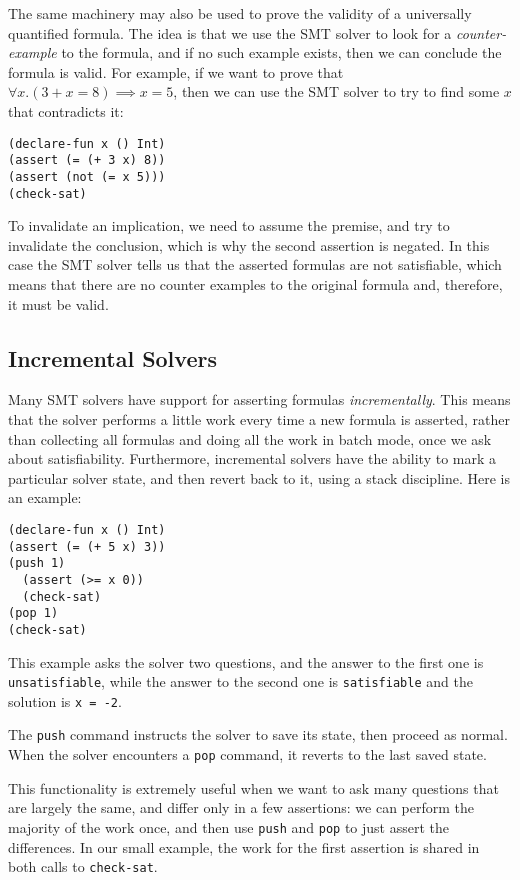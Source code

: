 \documentclass{sigplanconf}
\begin{document}
The same machinery may also be used to prove the validity of
a universally quantified formula. The idea is that we use the SMT solver
to look for a {\em counter-example} to the formula, and if no such
example exists, then we can conclude the formula is valid.
For example, if we want to prove that $\forall x. (3 + x = 8) \implies x = 5$,
then we can use the SMT solver to try to find some $x$ that contradicts it:

\break

\begin{Verbatim}
(declare-fun x () Int)
(assert (= (+ 3 x) 8))
(assert (not (= x 5)))
(check-sat)
\end{Verbatim}

To invalidate an implication, we need to assume the premise, and try to
invalidate the conclusion, which is why the second assertion is negated.
In this case the SMT solver tells us that the asserted formulas are not
satisfiable, which means that there are no counter examples to the original
formula and, therefore, it must be valid.

\subsection{Incremental Solvers}

Many SMT solvers have support for asserting formulas {\em incrementally}.
This means that the solver performs a little work every time a new formula
is asserted, rather than collecting all formulas and doing all the work
in batch mode, once we ask about satisfiability.  Furthermore, incremental
solvers have the ability to mark a particular solver state, and then revert
back to it, using a stack discipline.  Here is an example:

\begin{Verbatim}
(declare-fun x () Int)
(assert (= (+ 5 x) 3))
(push 1)
  (assert (>= x 0))
  (check-sat)
(pop 1)
(check-sat)
\end{Verbatim}

This example asks the solver two questions, and the answer to the first
one is \Verb"unsatisfiable", while the answer to the second one is
\Verb"satisfiable" and the solution is \Verb"x = -2".

The \Verb"push" command instructs the solver to save its state, then
proceed as normal.  When the solver encounters a \Verb"pop" command,
it reverts to the last saved state.

This functionality is extremely useful when we want to ask many questions
that are largely the same, and differ only in a few assertions:
we can perform the majority of the work once, and then use
\Verb"push" and \Verb"pop" to just assert the differences.
In our small example, the work for the first assertion is shared in
both calls to \Verb"check-sat".
\end{document}
